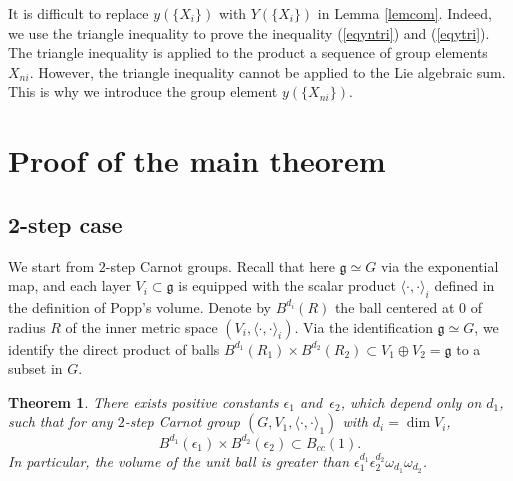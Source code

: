 \documentclass[pdftex]{sigma}
\numberwithin{equation}{section}
\newtheorem{Theorem}{Theorem}[section]
\newcommand{\g}{\mathfrak{g}}
\begin{document}
\begin{Remark}
 It is difficult to replace $y(\{X_i\})$ with $Y(\{X_i\})$ in Lemma \ref{lemcom}.
 Indeed,
 we use the triangle inequality to prove the inequality (\ref{eqyntri}) and (\ref{eqytri}).
 The triangle inequality is applied to the product a sequence of group elements $X_{ni}$.
 However, the triangle inequality cannot be applied to the Lie algebraic sum.
 This is why we introduce the group element $y(\{X_{ni}\})$.
\end{Remark}

\section{Proof of the main theorem}

\subsection{2-step case}

We start from $2$-step Carnot groups.
Recall that here $\g\simeq G$ via the exponential map,
and each layer $V_i\subset \g$ is equipped with the scalar product $\langle\cdot,\cdot\rangle_i$ defined in the definition of Popp's volume.
Denote by $B^{d_i}(R)$ the ball centered at $0$ of radius $R$ of the inner metric space $(V_i,\langle\cdot,\cdot\rangle_i)$.
Via the identification $\g\simeq G$,
we identify the direct product of balls $B^{d_1}(R_1)\times B^{d_2}(R_2)\subset V_1\oplus V_2=\g$ to a subset in $G$.

\begin{Theorem}\label{propstep2}
 There exists positive constants $\epsilon_1$ and~$\epsilon_2$,
 which depend only on $d_1$,
 such that for any $2$-step Carnot group $(G,V_1,\langle\cdot,\cdot\rangle_1)$ with $d_i=\dim V_i$,
 \[
 B^{d_1}(\epsilon_1)\times B^{d_2}(\epsilon_2)\subset B_{cc}(1).
 \]
 In particular,
 the volume of the unit ball is greater than $\epsilon_1^{d_1}\epsilon_2^{d_2}\omega_{d_1}\omega_{d_2}$.
\end{Theorem}
\end{document}
